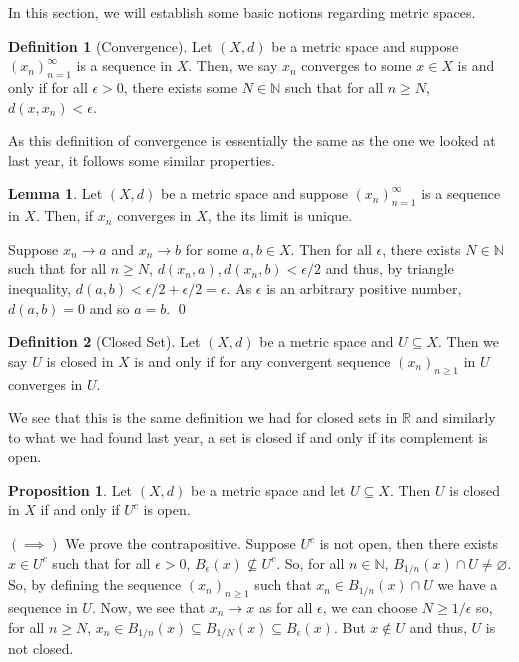 \documentclass[
]{article}
\theoremstyle{definition}
\newtheorem{prop}{Proposition}
\theoremstyle{definition}
\newtheorem{definition}{Definition}[section]
\newtheorem{lemma}{Lemma}[section]
\begin{document}
In this section, we will establish some basic notions regarding metric
spaces.

\begin{definition}[Convergence]
  Let \((X, d)\) be a metric space and suppose \((x_n)_{n = 1}^\infty\) is a 
  sequence in \(X\). Then, we say \(x_n\) converges to some \(x \in X\) is and 
  only if for all \(\epsilon > 0\), there exists some \(N \in \mathbb{N}\) such 
  that for all \(n \ge N\), \(d(x, x_n) < \epsilon\).
\end{definition}

As this definition of convergence is essentially the same as the one we
looked at last year, it follows some similar properties.

\begin{lemma}
  Let \((X, d)\) be a metric space and suppose \((x_n)_{n = 1}^\infty\) is a 
  sequence in \(X\). Then, if \(x_n\) converges in \(X\), the its limit is unique.
\end{lemma}
\proof

Suppose \(x_n \to a\) and \(x_n \to b\) for some \(a, b \in X\). Then
for all \(\epsilon\), there exists \(N \in \mathbb{N}\) such that for
all \(n \ge N\), \(d(x_n, a), d(x_n, b) < \epsilon / 2\) and thus, by
triangle inequality,
\(d(a, b) < \epsilon / 2 + \epsilon / 2 = \epsilon\). As \(\epsilon\) is
an arbitrary positive number, \(d(a, b) = 0\) and so \(a = b\). \qed

\begin{definition}[Closed Set]
  Let \((X, d)\) be a metric space and \(U \subseteq X\). Then we say \(U\) is 
  closed in \(X\) is and only if for any convergent sequence \((x_n)_{n \ge 1}\) 
  in \(U\) converges in \(U\).
\end{definition}

We see that this is the same definition we had for closed sets in
\(\mathbb{R}\) and similarly to what we had found last year, a set is
closed if and only if its complement is open.

\begin{prop}\label{closed_iff}
  Let \((X, d)\) be a metric space and let \(U \subseteq X\). Then \(U\) is 
  closed in \(X\) if and only if \(U^c\) is open.
\end{prop}
\proof

\((\implies)\) We prove the contrapositive. Suppose \(U^c\) is not open,
then there exists \(x \in U^c\) such that for all \(\epsilon > 0\),
\(B_\epsilon(x) \not\subseteq U^c\). So, for all \(n \in \mathbb{N}\),
\(B_{1 / n}(x) \cap U \neq \varnothing\). So, by defining the sequence
\((x_n)_{n \ge 1}\) such that \(x_n \in B_{1 / n}(x) \cap U\) we have a
sequence in \(U\). Now, we see that \(x_n \to x\) as for all
\(\epsilon\), we can choose \(N \ge 1 / \epsilon\) so, for all
\(n \ge N\),
\(x_n \in B_{1 / n}(x) \subseteq B_{1 / N}(x) \subseteq B_\epsilon (x)\).
But \(x \not\in U\) and thus, \(U\) is not closed.
\end{document}
